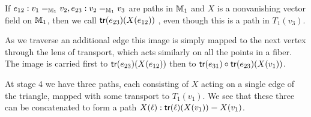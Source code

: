 \begin{mydef}
If \( e_{12}:v_1=_{\mathbb{M}_1} v_2, e_{23}:v_2=_{\mathbb{M}_1}v_3 \) are paths in \( \mathbb{M}_1 \) and \( X \) is a nonvanishing vector field on \( \mathbb{M}_1 \), then we call \( \mathsf{tr}(e_{23})(X(e_{12})) \) , even though this is a path in \( T_1(v_3) \).
\end{mydef}

As we traverse an additional edge this image is simply mapped to the next vertex through the lens of transport, which acts similarly on all the points in a fiber. The image is carried first to \( \mathsf{tr}(e_{23})(X(e_{12})) \) then to \( \mathsf{tr}(e_{31})\circ\mathsf{tr}(e_{23})(X(v_1)) \).

At stage 4 we have three paths, each consisting of \( X \) acting on a single edge of the triangle, mapped with some transport to \( T_1(v_1) \). We see that these three can be concatenated to form a path \( X(\ell):\mathsf{tr}(\ell)(X(v_1))=X(v_1) \).

